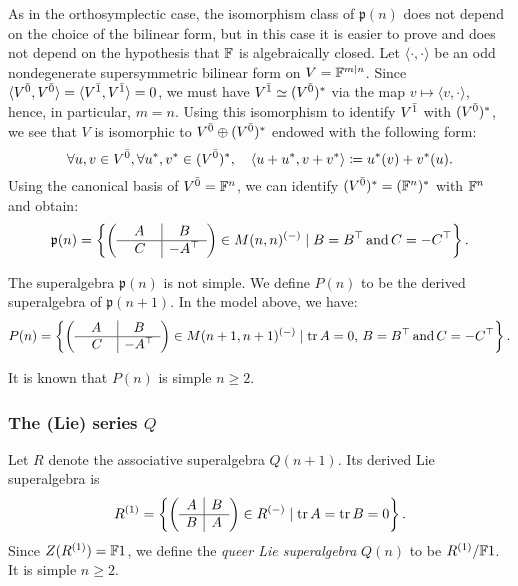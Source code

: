 As in the orthosymplectic case, the isomorphism class of $\mathfrak{p}(n)$ does not depend on the choice of the bilinear form, but in this case it is easier to prove and does not depend on the hypothesis that $\mathbb{F}$ is algebraically closed. 
Let $\langle \cdot, \cdot \rangle$ be an odd nondegenerate supersymmetric bilinear form on $V = \mathbb{F}^{m|n}$. 
Since $\langle V^{\bar0}, V^{\bar0} \rangle = \langle V^{\bar1}, V^{\bar1} \rangle = 0$, we must have $V^{\bar1} \simeq (V^{\bar0})^*$ via the map $v \mapsto \langle v, \cdot \rangle$, hence, in particular, $m = n$. 
Using this isomorphism to identify $V^{\bar1}$ with $(V^{\bar0})^*$, we see that $V$ is isomorphic to $V^{\bar0} \oplus (V^{\bar0})^*$ endowed with the following form:
\[
    \forall u,v\in V^{\bar0}, \forall u^*,v^*\in (V^{\bar0})^*, \quad \langle u+u^*,v + v^* \rangle \coloneqq u^*(v) + v^*(u). 
\]
Using the canonical basis of $V^{\bar0} = \mathbb{F}^n$, we can identify $(V^{\bar0})^* = (\mathbb{F}^n)^*$ with $\mathbb{F}^n$ and obtain:  
\[
    \mathfrak{p}(n) = \left\{
    \left(\begin{array}{c|c}
        A & B\\
        \hline
        \phantom{-}C\phantom{\transp} & -A\transp
    \end{array}\right) \in M(n,n)^{(-)} \mid B=B\transp \AND C=-C\transp\right\}. 
\]

The superalgebra $\mathfrak{p}(n)$ is not simple.
We define $P(n)$ to be the derived superalgebra of $\mathfrak{p}(n+1)$. 
In the model above, we have:
\[
    P(n) = \left\{
    \left(\begin{array}{c|c}
        A & B\\
        \hline
        \phantom{-}C\phantom{\transp} & -A\transp
    \end{array}\right) \in M(n+1,n+1)^{(-)} \mid \tr A =0, \, B=B\transp \AND C=-C\transp\right\}. 
\]

It is known that $P(n)$ is simple \IFF $n\geq 2$. 

\subsubsection{The (Lie) series $Q$}

Let $R$ denote the associative superalgebra $Q(n+1)$. 
Its derived Lie superalgebra is
\[
    R^{(1)} = \left\{
    \left(\begin{array}{c|c}
        A & B\\
        \hline
        B & A
    \end{array}\right) \in R^{(-)} \mid \operatorname{tr} A = \operatorname{tr} B = 0\right\}. 
\]
Since $Z(R^{(1)}) = \mathbb{F}1$, we define the \emph{queer Lie superalgebra} $Q(n)$ to be $R^{(1)}/\mathbb{F}1$. 
It is simple \IFF $n\geq 2$. 

